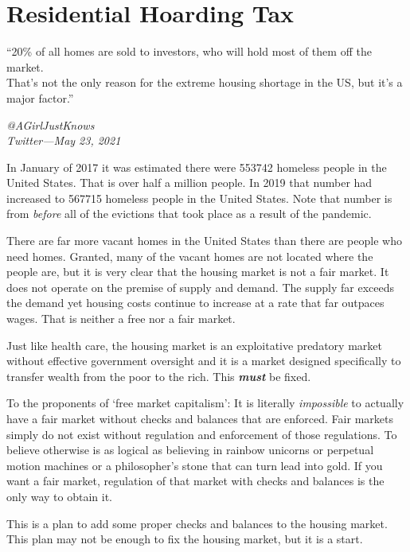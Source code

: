 \section{Residential Hoarding Tax}

\epigraph{``20\% of all homes are sold to investors, who will hold most of them off the market.\\[1\baselineskip] That's not the only reason for the extreme housing shortage in the US, but it's a major factor.''}{\textit{@AGirlJustKnows \\ Twitter---May 23, 2021}}

\noindent In January of 2017 it was estimated there were \num[group-separator={,}]{553742} homeless people in the United States. That is over half a million people. In 2019 that number had increased to \num[group-separator={,}]{567715} homeless people in the United States. Note that number is from \emph{before} all of the evictions that took place as a result of the \covid{} pandemic.

There are far more vacant homes in the United States than there are people who need homes. Granted, many of the vacant homes are not located where the people are, but it is very clear that the housing market is not a fair market. It does not operate on the premise of supply and demand. The supply far exceeds the demand yet housing costs continue to increase at a rate that far outpaces wages. That is neither a free nor a fair market.

Just like health care, the housing market is an exploitative predatory market without effective government oversight and it is a market designed specifically to transfer wealth from the poor to the rich. This \textbf{\emph{must}} be fixed.

To the proponents of `free market capitalism': It is literally \emph{impossible} to actually have a fair market without checks and balances that are enforced. Fair markets simply do not exist without regulation and enforcement of those regulations. To believe otherwise is as logical as believing in rainbow unicorns or perpetual motion machines or a philosopher's stone that can turn lead into gold. If you want a fair market, regulation of that market with checks and balances is the only way to obtain it.

This is a plan to add some proper checks and balances to the housing market. This plan may not be enough to fix the housing market, but it is a start.

